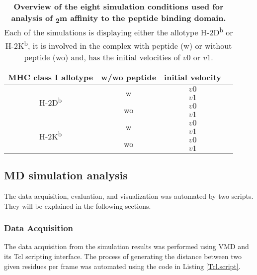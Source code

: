 \documentclass[11pt,twocolumn]{article}
\newcommand{\db}{H-2D\textsuperscript{b}\xspace}
\newcommand{\kb}{H-2K\textsuperscript{b}\xspace}
\newcommand{\btm}{\textbeta\textsubscript{2}m\xspace}
\begin{document}
\begin{table}[H]
\caption{\textbf{Overview of the eight simulation conditions used for analysis
of \btm affinity to the peptide binding domain.} Each of the simulations is
displaying either the allotype \db or \kb, it is involved in the complex with
peptide (w) or without peptide (wo) and, has the initial velocities of $v0$ or
$v1$.}
\label{simulations}
\centering 
\resizebox{0.4\textwidth}{!} {
\begin{tabular}{|c|c|c|c|}  \hline
MHC class I allotype& w/wo peptide&initial velocity\\ \hline
\multirow{4}{*}{\db}&\multirow{2}{*}{w}&$v0$\\
\cline{3-3} 
&&$v1$\\
\cline{2-3} 
&\multirow{2}{*}{wo}&$v0$\\
\cline{3-3} 
&&$v1$\\
\hline
\multirow{4}{*}{\kb}&\multirow{2}{*}{w}&$v0$\\
\cline{3-3} 
&&$v1$\\
\cline{2-3} 
&\multirow{2}{*}{wo}&$v0$\\
\cline{3-3} 
&&$v1$\\
\hline

\end{tabular}
}
\end{table}

\subsection*{MD simulation analysis}

The data acquisition, evaluation, and visualization was automated by two
scripts. They will be explained in the following  sections.

\subsubsection*{Data Acquisition}

The data acquisition from  the simulation results was performed using VMD and
its Tcl scripting interface. The process of generating the distance between two
given residues per frame was automated using the code in Listing
\ref{Tcl.script}.
\end{document}

